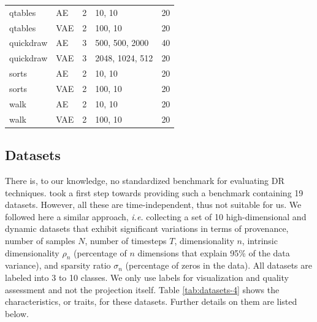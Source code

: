 \begin{table}[tb]
\begin{tabular}{llcll}
qtables    & AE  & 2                & 10, 10                      & 20        \\
qtables    & VAE  & 2                & 100, 10                     & 20        \\
quickdraw  & AE  & 3                & 500, 500, 2000              & 40        \\
quickdraw  & VAE  & 3                & 2048, 1024, 512             & 20        \\
sorts      & AE  & 2                & 10, 10                      & 20        \\
sorts      & VAE  & 2                & 100, 10                     & 20        \\
walk       & AE  & 2                & 10, 10                      & 20        \\
walk       & VAE  & 2                & 100, 10                     & 20        \\ \hline
\end{tabular}
\vspace{-0.15cm}
\end{table}


\subsection{Datasets}
\label{subsec:datasets}
%
There is, to our knowledge, no standardized benchmark for evaluating DR techniques. \cite{Espadoto19} took a first step towards providing such a benchmark containing 19 datasets. However, all these are time-independent, thus not suitable for us. We followed here a similar approach, \emph{i.e.} collecting a set of 10 high-dimensional and dynamic datasets that exhibit significant variations in terms of provenance, number of samples $N$, number of timesteps $T$, dimensionality $n$, intrinsic dimensionality $\rho_n$ (percentage of $n$ dimensions that explain 95\% of the data variance), and sparsity ratio $\sigma_n$ (percentage of zeros in the data). All datasets are labeled into 3 to 10 classes. We only use labels for visualization and quality assessment and not the projection itself. Table \ref{tab:datasets-4} shows the characteristics, or traits, for these datasets. Further details on them are listed below.

